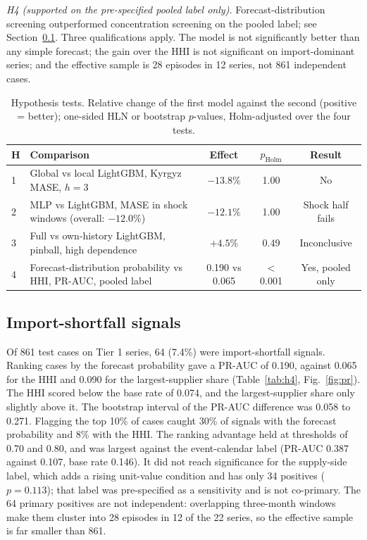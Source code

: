 \documentclass[conference]{IEEEtran}
\begin{document}
\textit{H4 (supported on the pre-specified pooled label only).} Forecast-distribution screening outperformed concentration screening on the pooled label; see Section~\ref{sec:warnings}. Three qualifications apply. The model is not significantly better than any simple forecast; the gain over the HHI is not significant on import-dominant series; and the effective sample is 28 episodes in 12 series, not 861 independent cases.

\begin{table}[t]
\centering
\caption{Hypothesis tests. Relative change of the first model against the second (positive = better); one-sided HLN or bootstrap $p$-values, Holm-adjusted over the four tests.}
\label{tab:hyp}
\small
\setlength{\tabcolsep}{3pt}
\begin{tabularx}{\columnwidth}{@{}l X c c c@{}}
\toprule
H & Comparison & Effect & $p_{\mathrm{Holm}}$ & Result\\
\midrule
1 & Global vs local LightGBM, Kyrgyz MASE, $h{=}3$ & $-13.8\%$ & 1.00 & No\\
2 & MLP vs LightGBM, MASE in shock windows (overall: $-12.0\%$) & $-12.1\%$ & 1.00 & Shock half fails\\
3 & Full vs own-history LightGBM, pinball, high dependence & $+4.5\%$ & 0.49 & Inconclusive\\
4 & Forecast-distribution probability vs HHI, PR-AUC, pooled label & 0.190 vs 0.065 & $<$0.001 & Yes, pooled only\\
\bottomrule
\end{tabularx}
\end{table}

\subsection{Import-shortfall signals}\label{sec:warnings}
Of 861 test cases on Tier 1 series, 64 (7.4\%) were import-shortfall signals. Ranking cases by the forecast probability gave a PR-AUC of 0.190, against 0.065 for the HHI and 0.090 for the largest-supplier share (Table~\ref{tab:h4}, Fig.~\ref{fig:pr}). The HHI scored below the base rate of 0.074, and the largest-supplier share only slightly above it. The bootstrap interval of the PR-AUC difference was 0.058 to 0.271. Flagging the top 10\% of cases caught 30\% of signals with the forecast probability and 8\% with the HHI. The ranking advantage held at thresholds of 0.70 and 0.80, and was largest against the event-calendar label (PR-AUC 0.387 against 0.107, base rate 0.146). It did not reach significance for the supply-side label, which adds a rising unit-value condition and has only 34 positives ($p=0.113$); that label was pre-specified as a sensitivity and is not co-primary. The 64 primary positives are not independent: overlapping three-month windows make them cluster into 28 episodes in 12 of the 22 series, so the effective sample is far smaller than 861.
\end{document}
